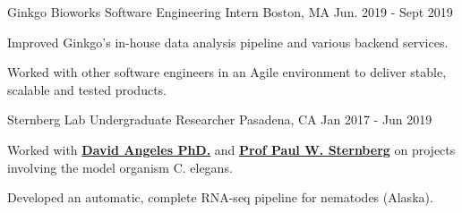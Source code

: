 \begin{cventries}
  \cventry
    {Ginkgo Bioworks} %
    {Software Engineering Intern} %
    {Boston, MA} %
    {Jun. 2019 - Sept 2019} %
    {
      \begin{cvitems} %
        \item {Improved Ginkgo's in-house data analysis pipeline and various backend services.}
        \item {Worked with other software engineers in an Agile environment to deliver stable, scalable and tested products.}
      \end{cvitems}
    }

\cventry
  {Sternberg Lab} %
  {Undergraduate Researcher} %
  {Pasadena, CA} %
  {Jan 2017 - Jun 2019} %
  {
    \begin{cvitems} %
      \item {Worked with \textbf{\href{https://dangeles.github.io/}{David Angeles PhD.}} and \textbf{\href{http://wormlab.caltech.edu/LabMembers/Paul}{Prof Paul W. Sternberg}} on projects involving the model organism C. elegans.}
      \item {Developed an automatic, complete RNA-seq pipeline for nematodes (Alaska).}
    \end{cvitems}
  }

\end{cventries}
